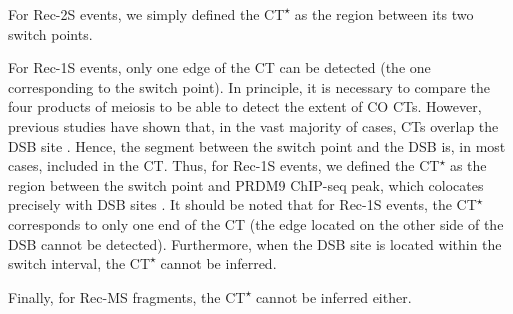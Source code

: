 For Rec-2S events, we simply defined the CT\textsuperscript{$\star$} as the region between its two switch points.

For Rec-1S events, only one edge of the CT can be detected (the one corresponding to the switch point). 
In principle, it is necessary to compare the four products of meiosis to be able to detect the extent of CO CTs.
However, previous studies have shown that, in the vast majority of cases, CTs overlap the DSB site \citep{cole2014mouse}.
Hence, the segment between the switch point and the DSB is, in most cases, included in the CT\@.
Thus, for Rec-1S events, we defined the CT\textsuperscript{$\star$} as the region between the switch point and PRDM9 ChIP-seq peak, which colocates precisely with DSB sites \citep{lange2016landscape}.
It should be noted that for Rec-1S events, the CT\textsuperscript{$\star$} corresponds to only one end of the CT (the edge located on the other side of the DSB cannot be detected).
Furthermore, when the DSB site is located within the switch interval, the CT\textsuperscript{$\star$} cannot be inferred.

Finally, for Rec-MS fragments, the CT\textsuperscript{$\star$} cannot be inferred either.




%
%
%



